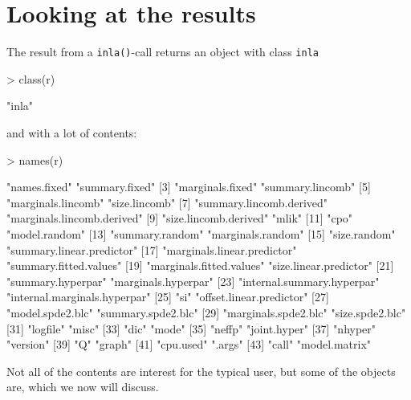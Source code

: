 \documentclass[a4paper,11pt]{report}
\newcommand{\tv}{\texttt}
\begin{document}
\section{Looking at the results}

The result from a \tv{inla()}-call returns an object with class
\tv{inla}
\begin{Schunk}
\begin{Sinput}
> class(r)
\end{Sinput}
\begin{Soutput}
[1] "inla"
\end{Soutput}
\end{Schunk}
and with a lot of contents:
\begin{Schunk}
\begin{Sinput}
> names(r)
\end{Sinput}
\begin{Soutput}
 [1] "names.fixed"                 "summary.fixed"              
 [3] "marginals.fixed"             "summary.lincomb"            
 [5] "marginals.lincomb"           "size.lincomb"               
 [7] "summary.lincomb.derived"     "marginals.lincomb.derived"  
 [9] "size.lincomb.derived"        "mlik"                       
[11] "cpo"                         "model.random"               
[13] "summary.random"              "marginals.random"           
[15] "size.random"                 "summary.linear.predictor"   
[17] "marginals.linear.predictor"  "summary.fitted.values"      
[19] "marginals.fitted.values"     "size.linear.predictor"      
[21] "summary.hyperpar"            "marginals.hyperpar"         
[23] "internal.summary.hyperpar"   "internal.marginals.hyperpar"
[25] "si"                          "offset.linear.predictor"    
[27] "model.spde2.blc"             "summary.spde2.blc"          
[29] "marginals.spde2.blc"         "size.spde2.blc"             
[31] "logfile"                     "misc"                       
[33] "dic"                         "mode"                       
[35] "neffp"                       "joint.hyper"                
[37] "nhyper"                      "version"                    
[39] "Q"                           "graph"                      
[41] "cpu.used"                    ".args"                      
[43] "call"                        "model.matrix"               
\end{Soutput}
\end{Schunk}
Not all of the contents are interest for the typical user, but some of
the objects are, which we now will discuss. 
\end{document}
